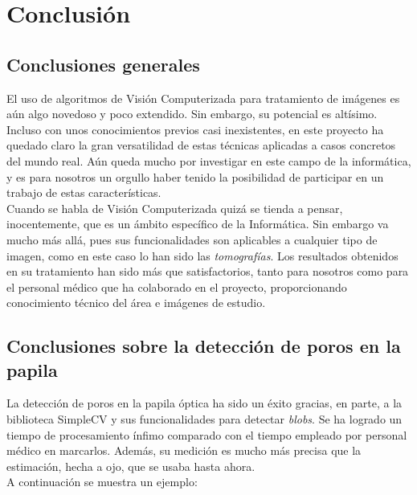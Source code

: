 \chapter{Conclusión}
\section{Conclusiones generales}
El uso de algoritmos de Visión Computerizada para tratamiento de
imágenes es aún algo novedoso y poco extendido. Sin embargo, su
potencial es altísimo. Incluso con unos conocimientos previos
casi inexistentes, en este proyecto ha quedado claro la gran
versatilidad de estas técnicas aplicadas a casos concretos del
mundo real. Aún queda mucho por investigar en este campo de la
informática, y es para nosotros un orgullo haber tenido la 
posibilidad de participar en un trabajo de estas características.\\
Cuando se habla de Visión Computerizada quizá se tienda a pensar,
inocentemente, que es un ámbito específico de la Informática. Sin
embargo va mucho más allá, pues sus funcionalidades son aplicables
a cualquier tipo de imagen, como en este caso lo han sido las 
\emph{tomografías}. Los resultados obtenidos en su tratamiento han
sido más que satisfactorios, tanto para nosotros como para el 
personal médico que ha colaborado en el proyecto, proporcionando
conocimiento técnico del área e imágenes de estudio.

\section{Conclusiones sobre la detección de poros en la papila}
La detección de poros en la papila óptica ha sido un éxito gracias,
en parte, a la biblioteca SimpleCV y sus funcionalidades para 
detectar \emph{blobs}. Se ha logrado un tiempo de procesamiento ínfimo 
comparado con el tiempo empleado por personal médico en marcarlos.
Además, su medición es mucho más precisa que la estimación, hecha
a ojo, que se usaba hasta ahora. \\
A continuación se muestra un ejemplo:

